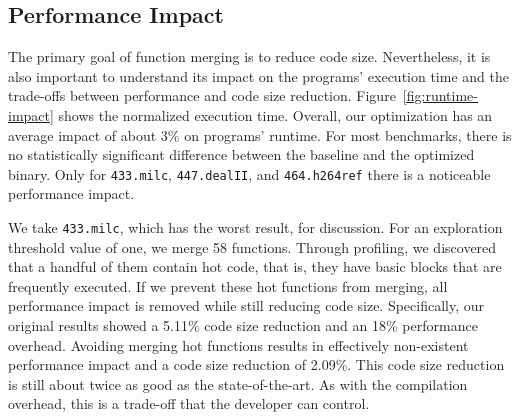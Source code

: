 \subsection{Performance Impact}


The primary goal of function merging is to reduce code size. Nevertheless, it is also important to understand its impact on the programs'
execution time and the trade-offs between performance and code size reduction. Figure~\ref{fig:runtime-impact} shows the normalized
execution time. Overall, our optimization has an average impact of about 3\% on programs' runtime. For most benchmarks, there is no
statistically significant difference between the baseline and the optimized binary. Only for \texttt{433.milc}, \texttt{447.dealII}, and
\texttt{464.h264ref} there is a noticeable performance impact.




We take \texttt{433.milc}, which has the worst result, for discussion. For an exploration threshold value of one, we merge 58 functions.
Through profiling, we discovered that a handful of them contain hot code, that is, they have basic blocks that are frequently executed. If we prevent these hot
functions from merging, all performance impact is removed while still reducing code size. Specifically, our original results showed a
5.11\% code size reduction and an 18\% performance overhead.
Avoiding merging hot functions results in effectively non-existent performance impact and
a code size reduction of 2.09\%.
This code size reduction is still about twice as good as the state-of-the-art. As with the
compilation overhead, this is a trade-off that the developer can control.



